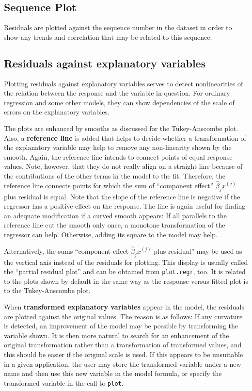 \documentclass{article}
\providecommand{\T}{\texttt}
\providecommand{\ul}{\textbf}
\begin{document}
\subsection{Sequence Plot}
Residuals are plotted against the sequence number in the dataset in order
to show any trends and correlation that may be related to this sequence.



\subsection{Residuals against explanatory variables}
Plotting residuals against explanatory variables serves to detect
nonlinearities of the relation between the response and the variable in
question. 
For ordinary regression and some other models, they can show dependencies
of the scale of errors on the explanatory variables.

The plots are enhanced by smooths as discussed for the Tukey-Anscombe
plot. 
Also, a \textbf{reference line} is added that helps to decide whether a
transformation of the explanatory variable may help to remove any
non-linearity shown by the smooth.
Again, the reference line intends to connect points of equal response
values. Note, however, that they do not really align on a straight line
because of the contributions of the other terms in the model to the fit.
Therefore, the reference line connects points for which the sum of 
``component effect'' $\widehat\beta_j x^{(j)}$ plus residual is equal.
Note that the slope of the reference line is negative if the regressor has
a positive effect on the response.
The line is again useful for finding an adequate modification if a curved
smooth appears: If all parallels to the reference line cut the smooth only
once, a monotone transformation of the regressor can help. 
Otherwise, adding its square to the model may help.

Alternatively, the sums 
``component effect $\widehat\beta_j x^{(j)}$ plus residual''
may be used as the vertical axis instead of the
residuals for plotting. This display is usually called the 
``partial residual plot'' and can be obtained from \T{plot.regr}, too. 
It is related to the plots shown by default in the same way as the
response versus fitted plot is to the Tukey-Anscombe plot.

When \ul{transformed explanatory variables} appear in the model, the
residuals are plotted against the original values. The reason is as
follows: If any curvature is detected, an improvement of the model may be
possible by transforming the variable shown. It is then more natural
to search for an enhancement of the original transformation rather than 
a transformation of transformed values, and this should be easier if 
the original scale is used.
If this appears to be unsuitable in a given application, the user
may store the transformed variable under a new name and then use 
this new variable in the model formula, or specify the transformed 
variable in the call to \T{plot}.
\end{document}
